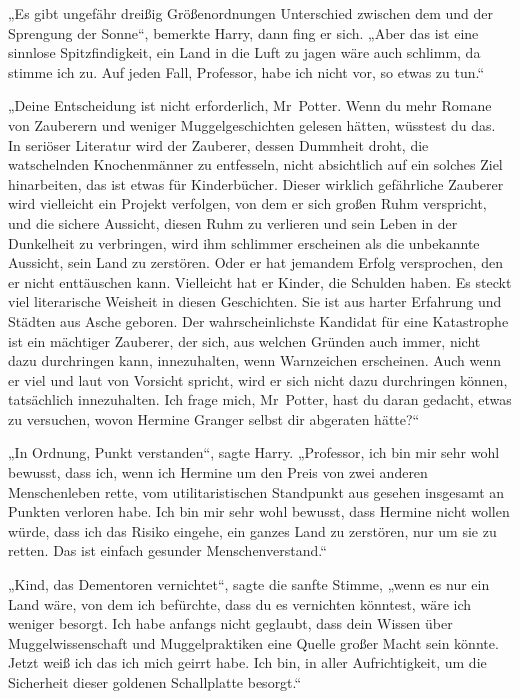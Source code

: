 {„Es gibt ungefähr dreißig Größenordnungen Unterschied zwischen dem und der Sprengung der Sonne“, bemerkte Harry, dann fing er sich. „Aber das ist eine sinnlose Spitzfindigkeit, ein Land in die Luft zu jagen wäre auch schlimm, da stimme ich zu. Auf jeden Fall, Professor, habe ich nicht vor, so etwas zu tun.“

„Deine Entscheidung ist nicht erforderlich, Mr~Potter. Wenn du mehr Romane von Zauberern und weniger Muggelgeschichten gelesen hätten, wüsstest du das. In seriöser Literatur wird der Zauberer, dessen Dummheit droht, die watschelnden Knochenmänner zu entfesseln, nicht absichtlich auf ein solches Ziel hinarbeiten, das ist etwas für Kinderbücher. Dieser wirklich gefährliche Zauberer wird vielleicht ein Projekt verfolgen, von dem er sich großen Ruhm verspricht, und die sichere Aussicht, diesen Ruhm zu verlieren und sein Leben in der Dunkelheit zu verbringen, wird ihm schlimmer erscheinen als die unbekannte Aussicht, sein Land zu zerstören. Oder er hat jemandem Erfolg versprochen, den er nicht enttäuschen kann. Vielleicht hat er Kinder, die Schulden haben. Es steckt viel literarische Weisheit in diesen Geschichten. Sie ist aus harter Erfahrung und Städten aus Asche geboren. Der wahrscheinlichste Kandidat für eine Katastrophe ist ein mächtiger Zauberer, der sich, aus welchen Gründen auch immer, nicht dazu durchringen kann, innezuhalten, wenn Warnzeichen erscheinen. Auch wenn er viel und laut von Vorsicht spricht, wird er sich nicht dazu durchringen können, tatsächlich innezuhalten. Ich frage mich, Mr~Potter, hast du daran gedacht, etwas zu versuchen, wovon Hermine Granger selbst dir abgeraten hätte?“

„In Ordnung, Punkt verstanden“, sagte Harry. „Professor, ich bin mir sehr wohl bewusst, dass ich, wenn ich Hermine um den Preis von zwei anderen Menschenleben rette, vom utilitaristischen Standpunkt aus gesehen insgesamt an Punkten verloren habe. Ich bin mir sehr wohl bewusst, dass Hermine nicht wollen würde, dass ich das Risiko eingehe, ein ganzes Land zu zerstören, nur um sie zu retten. Das ist einfach gesunder Menschenverstand.“

„Kind, das Dementoren vernichtet“, sagte die sanfte Stimme, „wenn es nur ein Land wäre, von dem ich befürchte, dass du es vernichten könntest, wäre ich weniger besorgt. Ich habe anfangs nicht geglaubt, dass dein Wissen über Muggelwissenschaft und Muggelpraktiken eine Quelle großer Macht sein könnte. Jetzt weiß ich das ich mich geirrt habe. Ich bin, in aller Aufrichtigkeit, um die Sicherheit dieser goldenen Schallplatte besorgt.“

}
